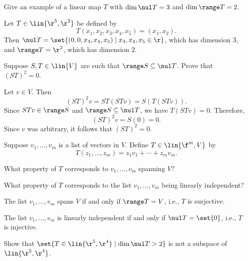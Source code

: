 \begin{exercise}[3b1]
    Give an example of a linear map $T$ with $\dim \nul T = 3$ and $\dim \range T = 2$.
\end{exercise}

\begin{sol}
    Let $T \in \lin{\r^5, \r^2}$ be defined by
    \[T(x_1, x_2, x_3, x_4, x_5) = (x_1, x_2).\]
    Then $\nul T = \set{(0, 0, x_3, x_4, x_5) \mid x_3, x_4, x_5 \in \r}$, which has dimension $3$, and $\range T = \r^2$, which has dimension $2$.
\end{sol}

\begin{exercise}[3b2]
    Suppose $S, T \in \lin{V}$ are such that $\range S \subseteq \nul T$. Prove that $(ST)^2 = 0$.
\end{exercise}

\begin{sol}
    Let $v \in V$. Then
    \[(ST)^2 v = ST(STv) = S(T(STv)).\]
    Since $STv \in \range S$ and $\range S \subseteq \nul T$, we have $T(STv) = 0$. Therefore,
    \[(ST)^2 v = S(0) = 0.\]
    Since $v$ was arbitrary, it follows that $(ST)^2 = 0$.
\end{sol}

\begin{exercise}[3b3]
    Suppose $v_1, \ldots, v_m$ is a list of vectors in $V$. Define $T \in \lin{\f^m, V}$ by
    \[T(z_1, \ldots, z_m) = z_1 v_1 + \cdots + z_m v_m.\]
    \begin{subexercises}
        \item What property of $T$ corresponds to $v_1, \ldots, v_m$ spanning $V$?
        \item What property of $T$ corresponds to the list $v_1, \ldots, v_m$ being linearly independent?
    \end{subexercises}
\end{exercise}

\begin{sole}
    \item The list $v_1, \ldots, v_m$ spans $V$ if and only if $\range T = V$, i.e., $T$ is surjective.
    \item The list $v_1, \ldots, v_m$ is linearly independent if and only if $\nul T = \set{0}$, i.e., $T$ is injective.
\end{sole}

\begin{exercise}[3b4]
    Show that $\set{T \in \lin{\r^5, \r^4} \mid \dim \nul T > 2}$ is not a subspace of $\lin{\r^5, \r^4}$.
\end{exercise}


